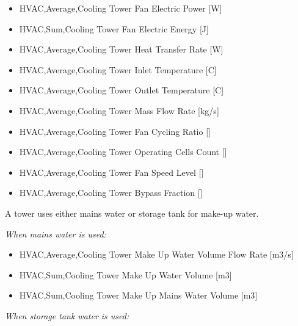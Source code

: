 \begin{itemize}
\item
  HVAC,Average,Cooling Tower Fan Electric Power {[}W{]}
\item
  HVAC,Sum,Cooling Tower Fan Electric Energy {[}J{]}
\item
  HVAC,Average,Cooling Tower Heat Transfer Rate {[}W{]}
\item
  HVAC,Average,Cooling Tower Inlet Temperature {[}C{]}
\item
  HVAC,Average,Cooling Tower Outlet Temperature {[}C{]}
\item
  HVAC,Average,Cooling Tower Mass Flow Rate {[}kg/s{]}
\item
  HVAC,Average,Cooling Tower Fan Cycling Ratio {[]}
\item
  HVAC,Average,Cooling Tower Operating Cells Count {[]}
\item
  HVAC,Average,Cooling Tower Fan Speed Level {[]}
\item
  HVAC,Average,Cooling Tower Bypass Fraction {[]}
\end{itemize}

A tower uses either mains water or storage tank for make-up water.

\emph{When mains water is used:}

\begin{itemize}
\item
  HVAC,Average,Cooling Tower Make Up Water Volume Flow Rate {[}m3/s{]}
\item
  HVAC,Sum,Cooling Tower Make Up Water Volume {[}m3{]}
\item
  HVAC,Sum,Cooling Tower Make Up Mains Water Volume {[}m3{]}
\end{itemize}

\emph{When storage tank water is used:}

